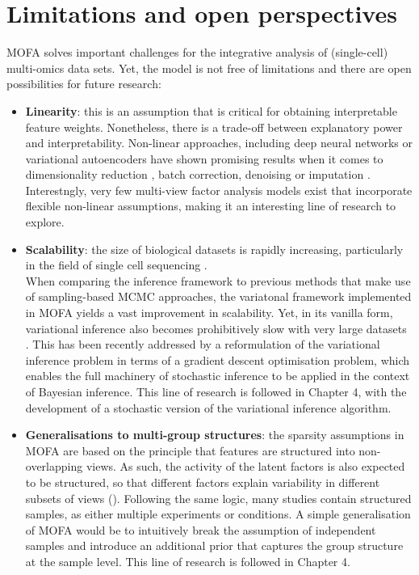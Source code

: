\section{Limitations and open perspectives}

MOFA solves important challenges for the integrative analysis of (single-cell) multi-omics data sets. Yet, the model is not free of limitations and there are open possibilities for future research:

\begin{itemize}

	\item \textbf{Linearity}: this is an assumption that is critical for obtaining interpretable feature weights. Nonetheless, there is a trade-off between explanatory power and interpretability\cite{Kuhn}. Non-linear approaches, including deep neural networks or variational autoencoders have shown promising results when it comes to dimensionality reduction \cite{Lin2017,Ding2018,Lopez2018}, batch correction\cite{Lopez2018}, denoising \cite{Eraslan2019} or imputation \cite{Lin2016}. Interestngly, very few multi-view factor analysis models exist that incorporate flexible non-linear assumptions, making it an interesting line of research to explore.

	\item \textbf{Scalability}: the size of biological datasets is rapidly increasing, particularly in the field of single cell sequencing \cite{Svensson2018,Cao2019}. \\
	When comparing the inference framework to previous methods that make use of sampling-based MCMC approaches, the variatonal framework implemented in MOFA yields a vast improvement in scalability. Yet, in its vanilla form, variational inference also becomes prohibitively slow with very large datasets \cite{Hoffman2013,Blei2016,Hoffman2014}. This has been recently addressed by a reformulation of the variational inference problem in terms of a gradient descent optimisation problem, which enables the full machinery of stochastic inference to be applied in the context of Bayesian inference. This line of research is followed in Chapter 4, with the development of a stochastic version of the variational inference algorithm.

	\item \textbf{Generalisations to multi-group structures}: the sparsity assumptions in MOFA are based on the principle that features are structured into non-overlapping views. As such, the activity of the latent factors is also expected to be structured, so that different factors explain variability in different subsets of views (). Following the same logic, many studies contain structured samples, as either multiple experiments or conditions. A simple generalisation of MOFA would be to intuitively break the assumption of independent samples and introduce an additional prior that captures the group structure at the sample level. This line of research is followed in Chapter 4.


\end{itemize}
